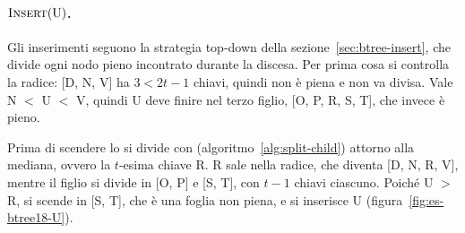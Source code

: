 \paragraph{$\textsc{Insert}(\mathrm{U})$.}
Gli inserimenti seguono la strategia top-down della sezione~\ref{sec:btree-insert}, che divide ogni nodo pieno incontrato durante la discesa. Per prima cosa si controlla la radice: [D, N, V] ha $3 < 2t-1$ chiavi, quindi non è piena e non va divisa. Vale N $<$ U $<$ V, quindi U deve finire nel terzo figlio, [O, P, R, S, T], che invece è pieno.

Prima di scendere lo si divide con \BTreeSplitChild{} (algoritmo~\ref{alg:split-child}) attorno alla mediana, ovvero la $t$-esima chiave R. R sale nella radice, che diventa [D, N, R, V], mentre il figlio si divide in [O, P] e [S, T], con $t-1$ chiavi ciascuno. Poiché U $>$ R, si scende in [S, T], che è una foglia non piena, e si inserisce U (figura~\ref{fig:es-btree18-U}).

